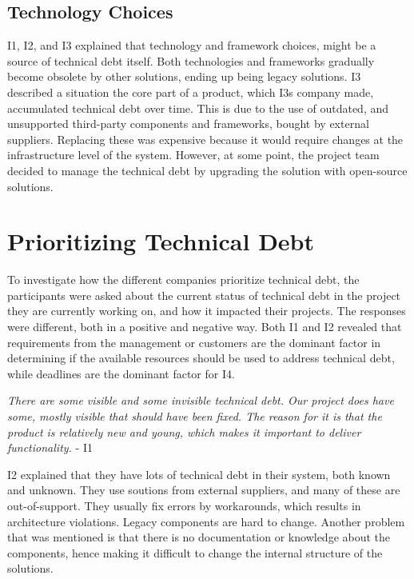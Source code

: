 \subsection{Technology Choices}
I1, I2, and I3 explained that technology and framework choices, might be a source of technical debt itself. Both technologies and frameworks gradually become obsolete by other solutions, ending up being legacy solutions. I3 described a situation the core part of a product, which I3s company made, accumulated technical debt over time. This is due to the use of outdated, and unsupported third-party components and frameworks, bought by external suppliers. Replacing these was expensive because it would require changes at the infrastructure level of the system. However, at some point, the project team decided to manage the technical debt by upgrading the solution with open-source solutions.









\section{Prioritizing Technical Debt}
\label{sec:prior}

To investigate how the different companies prioritize technical debt, the participants were asked about the current status of technical debt in the project they are currently working on, and how it impacted their projects. The responses were different, both in a positive and negative way. Both I1 and I2 revealed that requirements from the management or customers are the dominant factor in determining if the available resources should be used to address technical debt, while deadlines are the dominant factor for I4. 

\begin{displayquote}
\textit{There are some visible and some invisible technical debt. Our project does have some, mostly visible that should have been fixed. The reason for it is that the product is relatively new and young, which makes it important to deliver functionality.} - I1
\end{displayquote} 

I2 explained that they have lots of technical debt in their system, both known and unknown. They use soutions from external suppliers, and many of these are out-of-support. They usually fix errors by workarounds, which results in architecture violations. Legacy components are hard to change. Another problem that was mentioned is that there is no documentation or knowledge about the components, hence making it difficult to change the internal structure of the solutions.

